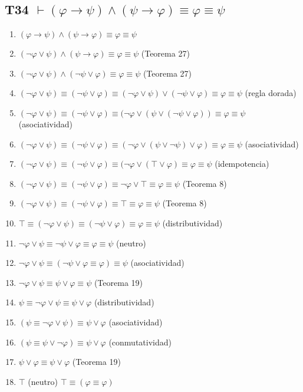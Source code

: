 \subsection{T34 $\vdash (\varphi \rightarrow \psi) \land (\psi \rightarrow \varphi) \equiv \varphi \equiv \psi$}

\begin{enumerate}
    \item $(\varphi \rightarrow \psi) \land (\psi \rightarrow \varphi) \equiv \varphi \equiv \psi$
    \item $(\neg\varphi \lor \psi) \land (\psi \rightarrow \varphi) \equiv \varphi \equiv \psi$ \hfill (Teorema 27)
    \item $(\neg\varphi \lor \psi) \land (\neg\psi \lor \varphi) \equiv \varphi \equiv \psi$ \hfill (Teorema 27)
    \item $(\neg\varphi \lor \psi) \equiv (\neg\psi \lor \varphi) \equiv (\neg\varphi \lor \psi) \lor (\neg\psi \lor \varphi) \equiv \varphi \equiv \psi$ \hfill (regla dorada)
    \item $(\neg\varphi \lor \psi) \equiv (\neg\psi \lor \varphi) \equiv (\neg\varphi \lor (\psi \lor (\neg\psi \lor \varphi)) \equiv \varphi \equiv \psi$ \hfill (asociatividad)
    \item $(\neg\varphi \lor \psi) \equiv (\neg\psi \lor \varphi) \equiv (\neg\varphi \lor (\psi \lor \neg\psi) \lor \varphi) \equiv \varphi \equiv \psi$ \hfill (asociatividad)
    \item $(\neg\varphi \lor \psi) \equiv (\neg\psi \lor \varphi) \equiv (\neg\varphi \lor (\top \lor \varphi) \equiv \varphi \equiv \psi$ \hfill (idempotencia)
    \item $(\neg\varphi \lor \psi) \equiv (\neg\psi \lor \varphi) \equiv \neg\varphi \lor \top \equiv \varphi \equiv \psi$ \hfill (Teorema 8)
    \item $(\neg\varphi \lor \psi) \equiv (\neg\psi \lor \varphi) \equiv \top \equiv \varphi \equiv \psi$ \hfill (Teorema 8)
    \item $\top \equiv (\neg\varphi \lor \psi) \equiv (\neg\psi \lor \varphi) \equiv \varphi \equiv \psi$ \hfill (distributividad)
    \item $\neg\varphi \lor \psi \equiv \neg\psi \lor \varphi \equiv \varphi \equiv \psi$ \hfill (neutro)
    \item $\neg\varphi \lor \psi \equiv (\neg\psi \lor \varphi \equiv \varphi) \equiv \psi$ \hfill (asociatividad)
    \item $\neg\varphi \lor \psi \equiv \psi \lor \varphi \equiv \psi$ \hfill (Teorema 19)
    \item $\psi \equiv \neg\varphi \lor \psi \equiv \psi \lor \varphi$ \hfill (distributividad)
    \item $(\psi \equiv \neg\varphi \lor \psi) \equiv \psi \lor \varphi$ \hfill (asociatividad)
    \item $(\psi \equiv \psi \lor \neg\varphi) \equiv \psi \lor \varphi$ \hfill (conmutatividad)
    \item $\psi \lor \varphi \equiv \psi \lor \varphi$ \hfill (Teorema 19)
    \item $\top$ \hfill (neutro) $\top \equiv (\varphi \equiv \varphi)$

\end{enumerate}

